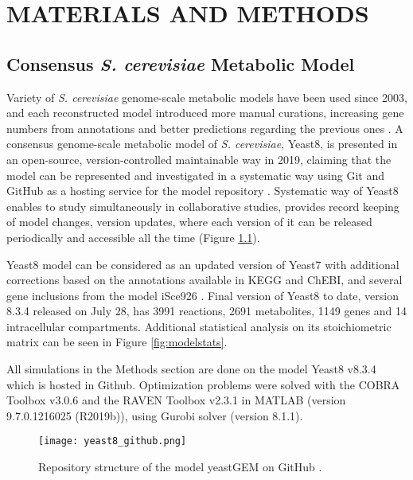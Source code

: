 \chapter{MATERIALS AND METHODS}

\section{Consensus \emph{S. cerevisiae} Metabolic Model}
Variety of \emph{S. cerevisiae} genome-scale metabolic models have been used since 2003, and each reconstructed model introduced more manual curations, increasing gene numbers from annotations and better predictions regarding the previous ones \cite{lopes2017genome}. A consensus genome-scale metabolic model of \emph{S. cerevisiae}, Yeast8, is presented in an open-source, version-controlled maintainable way in 2019, claiming that the model can be represented and investigated in a systematic way using Git and GitHub as a hosting service for the model repository \cite{lu2019consensus}. Systematic way of Yeast8 enables to study simultaneously in collaborative studies, provides record keeping of model changes, version updates, where each version of it can be released periodically and accessible all the time (Figure \ref{fig:yeast8_github}).

Yeast8 model can be considered as an updated version of Yeast7 \cite{aung2013revising} with additional corrections based on the annotations available in KEGG and ChEBI, and several gene inclusions from the model iSce926 \cite{chowdhury2015using}. Final version of Yeast8 to date, version 8.3.4 released on July 28, has 3991 reactions, 2691 metabolites, 1149 genes and 14 intracellular compartments. Additional statistical analysis on its stoichiometric matrix can be seen in Figure \ref{fig:modelstats}.

All simulations in the Methods section are done on the model Yeast8 v8.3.4 which is hosted in Github. Optimization problems were solved with the COBRA Toolbox v3.0.6 and the RAVEN Toolbox v2.3.1 in MATLAB (version 9.7.0.1216025 (R2019b)), using Gurobi solver (version 8.1.1).

\begin{figure}[H]
\begin{center}
\texttt{[image: yeast8\_github.png]}
\end{center}
\caption[Repository structure of the model yeastGEM on GitHub \cite{lu2019consensus}]{Repository structure of the model yeastGEM on GitHub \cite{lu2019consensus}.}
\label{fig:yeast8_github}
\end{figure}

